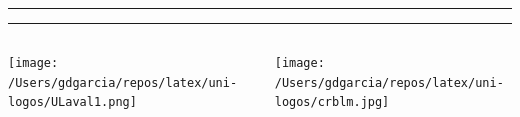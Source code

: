 \documentclass[xcolor=dvipsnames, handout, onlymath, 10pt, aspectratio=169]{beamer}
\title{\course}
\subtitle{\classtopic}
\author{Guilherme D.\ Garcia}
\institute[Université Laval] %
{
  \mylink{https://gdgarcia.ca}{gdgarcia.ca}\vspace{5ex}
}
\date{\classdate}
\begin{document}
\begin{frame}
	\vspace{2ex}
	\textcolor{lav1}{\noindent\rule{0.66\textwidth}{3pt}}
	\textcolor{lav2}{\noindent\rule{0.33\textwidth}{3pt}}

	\titlepage

	\vfill

	\begin{columns}
		\begin{column}{0.5\textwidth}
			\begin{flushleft}
				{\texttt{[image: /Users/gdgarcia/repos/latex/uni-logos/ULaval1.png]}}
			\end{flushleft}
		\end{column}
		\begin{column}{0.5\textwidth}
			\begin{flushright}
				{\texttt{[image: /Users/gdgarcia/repos/latex/uni-logos/crblm.jpg]}}
			\end{flushright}
		\end{column}
	\end{columns}

\end{frame}








\end{document}
